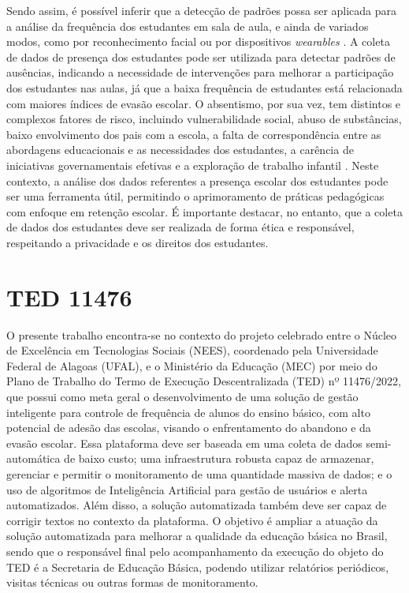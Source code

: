     Sendo assim, é possível inferir que a detecção de padrões possa ser aplicada para a análise da frequência dos estudantes em sala de aula, e ainda de variados modos, como por reconhecimento facial \cite{BUDIMAN202331} ou por dispositivos \textit{wearables} \cite{ferreira:sbie}. A coleta de dados de presença dos estudantes pode ser utilizada para detectar padrões de ausências, indicando a necessidade de intervenções para melhorar a participação dos estudantes nas aulas, já que a baixa frequência de estudantes está relacionada com maiores índices de evasão escolar. O absentismo, por sua vez, tem distintos e complexos fatores de risco, incluindo vulnerabilidade social, abuso de substâncias, baixo envolvimento dos pais %
    com a escola, a falta de correspondência entre as abordagens educacionais e as necessidades dos estudantes, a carência de iniciativas governamentais efetivas e a exploração de trabalho infantil \cite{nascimento:2020, gubbels:2019}. Neste contexto, a análise dos dados referentes a presença escolar dos estudantes pode ser uma ferramenta útil, permitindo o aprimoramento de práticas pedagógicas com enfoque em retenção escolar. É importante destacar, no entanto, que a coleta de dados dos estudantes deve ser realizada de forma ética e responsável, respeitando a privacidade e os direitos dos estudantes.

\section{TED 11476}

O presente trabalho encontra-se no contexto do projeto celebrado entre o Núcleo de Excelência em Tecnologias Sociais (NEES), coordenado pela Universidade Federal de Alagoas (UFAL), e o Ministério da Educação (MEC) por meio do Plano de Trabalho do Termo de Execução Descentralizada (TED) nº 11476/2022, que possui como meta geral o desenvolvimento de uma solução de gestão inteligente para controle de frequência de alunos do ensino básico, com alto potencial de adesão das escolas, visando o enfrentamento do abandono e da evasão escolar. Essa plataforma deve ser baseada em uma coleta de dados semi-automática de baixo custo; uma infraestrutura robusta capaz de armazenar, gerenciar e permitir o monitoramento de uma quantidade massiva de dados; e o uso de algoritmos de Inteligência Artificial para gestão de usuários e alerta automatizados. Além disso, a solução automatizada também deve ser capaz de corrigir textos no contexto da plataforma. O objetivo é ampliar a atuação da solução automatizada para melhorar a qualidade da educação básica no Brasil, sendo que o responsável final pelo acompanhamento da execução do objeto do TED é a Secretaria de Educação Básica, podendo utilizar relatórios periódicos, visitas técnicas ou outras formas de monitoramento.

